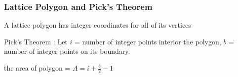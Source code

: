 \subsubsection{Lattice Polygon and Pick's Theorem}

A lattice polygon has integer coordinates for all of its vertices

Pick's Theorem : Let $i$ = number of integer points interior the polygon, $b$ = number of integer points on its boundary. 

the area of polygon = $A = i + \frac{b}{2} - 1$